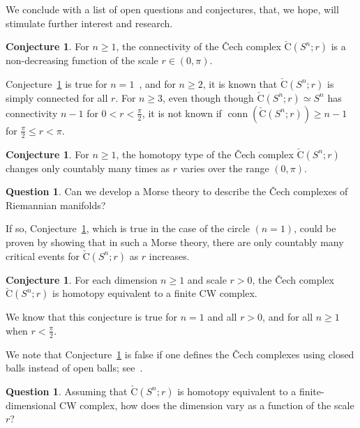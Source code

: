 \documentclass[11 pt,a4paper,twoside,reqno]{amsart}
\theoremstyle{definition}
\newtheorem{conjecture}[theorem]{Conjecture}
\newtheorem{question}[theorem]{Question}
\newcommand{\cech}[2]{\mathrm{\check{C}}(#1;#2)}
\DeclareMathOperator{\conn}{conn}
\begin{document}
We conclude with a list of open questions and conjectures, that, we hope, will stimulate further interest and research.

\begin{conjecture}
\label{conj:non-decreasing}
For $n\ge 1$, the connectivity of the \v{C}ech complex $\cech{S^n}{r}$ is a non-decreasing function of the scale $r\in(0,\pi)$.
\end{conjecture}

Conjecture~\ref{conj:non-decreasing} is true for $n=1$~\cite[Section~9]{AA-VRS1}, and for $n\ge 2$, it is known that $\cech{S^n}{r}$ is simply connected for all $r$.
For $n\ge 3$, even though though $\cech{S^n}{r}\simeq S^n$ has connectivity $n-1$ for $0<r<\frac{\pi}{2}$, it is not known if $\conn(\cech{S^n}{r})\ge n-1$ for $\frac{\pi}{2}\le r<\pi$.

\begin{conjecture}
\label{conj:countably}
For $n\ge 1$, the homotopy type of the \v{C}ech complex $\cech{S^n}{r}$ changes only countably many times as $r$ varies over the range $(0,\pi)$.
\end{conjecture}

\begin{question}
Can we develop a Morse theory to describe the \v{C}ech complexes of Riemannian manifolds?
\end{question}

If so, Conjecture~\ref{conj:countably}, which is true in the case of the circle $(n=1)$, could be proven by showing that in such a Morse theory, there are only countably many critical events for $\cech{S^n}{r}$ as $r$ increases.

\begin{conjecture}\label{conj:finite}
For each dimension $n\ge 1$ and scale $r>0$, the \v{C}ech complex $\cech{S^n}{r}$ is homotopy equivalent to a finite CW complex.
\end{conjecture}

We know that this conjecture is true for $n=1$ and all $r>0$, and for all $n\ge 1$ when $r<\frac{\pi}{2}$.

We note that Conjecture~\ref{conj:finite} is false if one defines the \v{C}ech complexes using closed balls instead of open balls; see~\cite[Section~9]{AA-VRS1}.

\begin{question}
Assuming that $\cech{S^n}{r}$ is homotopy equivalent to a finite-dimensional CW complex, how does the dimension vary as a function of the scale $r$?
\end{question}
\end{document}
